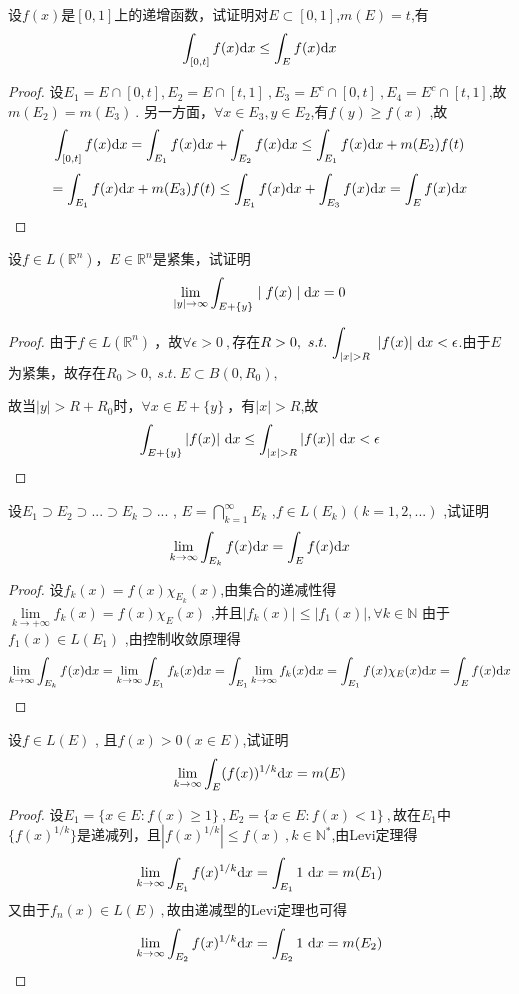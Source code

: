 设$f(x)$是$[0,1]$上的递增函数，试证明对$E \subset [0,1]$,$m(E)=t$,有$$\int_{[0,t]} f(x) \mathrm{d}x \leq \int_E f(x) \mathrm{d}x$$
\begin{proof}
设$E_1=E\cap[0,t], E_2=E\cap[t,1]\ ,E_3=E^c\cap[0,t]\ ,E_4=E^c\cap[t,1]$,故$m(E_2)=m(E_3)\ $.
另一方面，$\forall x\in E_3,y\in E_2$,有$f(y)\geq f(x)$
,故$$\int_{[0,t]}f(x)\mathrm{d}x=\int_{E_1}f(x)\mathrm{d}x+\int_{E_2}f(x)\mathrm{d}x\leq\int_{E_1}f(x)\mathrm{d}x+m(E_2)f(t)$$$$=\int_{E_1}f(x)\mathrm{d}x+m(E_3)f(t)\leq \int_{E_1}f(x)\mathrm{d}x+\int_{E_3}f(x)\mathrm{d}x=\int_{E}f(x)\mathrm{d}x$$
\end{proof}


设$f\in L(\mathbb{R}^n)$，$E\in \mathbb{R}^n$是紧集，试证明$$\lim\limits_{\mid y \mid \to \infty} \int_{E+\{y\}} \mid f(x) \mid \mathrm{d}x=0$$
\begin{proof}
由于$f\in L(\mathbb{R}^n) \ $，故$\forall \epsilon>0\ ,$存在$R>0,\ s.t.\ \displaystyle{\int_{|x|>R}\ |f(x)|\ \di{x}<\epsilon}$.由于$E$为紧集，故存在$R_0>0,\ s.t. \ E\subset B(0,R_0),$\par 故当$|y|>R+R_0$时，$\forall x\in E+\{y\}\ $，有$|x|>R$,故$$\int_{E+\{y\}}|f(x)|
\ \di{x\leq\int_{|x|>R}}|f(x)|\ \di{x<\epsilon}$$
\end{proof}


设$E_1 \supset E_2 \supset...\supset E_k \supset... $ , $ E=\bigcap\limits_{k=1}^{\infty}{E_k} $ ,$ f\in L(E_k)(k=1,2,...) $ ,试证明$$\lim\limits_{k \to \infty}\int_{E_k} f(x) \mathrm{d}x=\int_E f(x) \mathrm{d}x$$
\begin{proof}
设$f_k(x)=f(x)\chi_{E_k}(x)$,由集合的递减性得$\lim\limits_{k \to +\infty}f_k(x)=f(x)\chi_E(x) $ ,并且$\mid f_k(x)\mid \leq  \mid f_1(x)\mid ,\forall k \in \mathbb{N}$ 由于$f_1(x)\in L(E_1) $ ,由控制收敛原理得$$\lim\limits_{k \to \infty} \int_{E_k} f(x) \mathrm{d}x=\lim\limits_{k \to \infty} \int_{E_1} f_k(x) \mathrm{d}x= \int_{E_1} \lim\limits_{k \to \infty}f_k(x) \mathrm{d}x=\int_{E_1} f(x)\chi_E(x) \mathrm{d}x=\int_{E} f(x) \mathrm{d}x $$
\end{proof}


设$f\in L(E)$ , 且$f(x)>0(x \in E)$,试证明$$\lim\limits_{k \to \infty}\int_{E} (f(x))^{1/k} \mathrm{d}x=m(E)$$
\begin{proof}
设$E_1=\{x\in E:f(x)\geq1\}\ ,E_2=\{x\in E:f(x)<1\}\ ,$故在$E_1$中$\{f(x)^{1/k}\}$是递减列，且$|f(x)^{1/k}|\leq f(x)\ ,k \in \mathbb{N}^*$,由Levi定理得$$\lim\limits_{k\to\infty}\int_{E_1}f(x)^{1/k}\mathrm{d}x= \int_{E_1}1\ \mathrm{d}x=m(E_1)$$
又由于$f_n(x)\in L(E)\ ,$故由递减型的Levi定理也可得$$\lim\limits_{k\to\infty}\int_{E_2}f(x)^{1/k}\mathrm{d}x= \int_{E_2}1\ \mathrm{d}x=m(E_2)$$
\end{proof}


